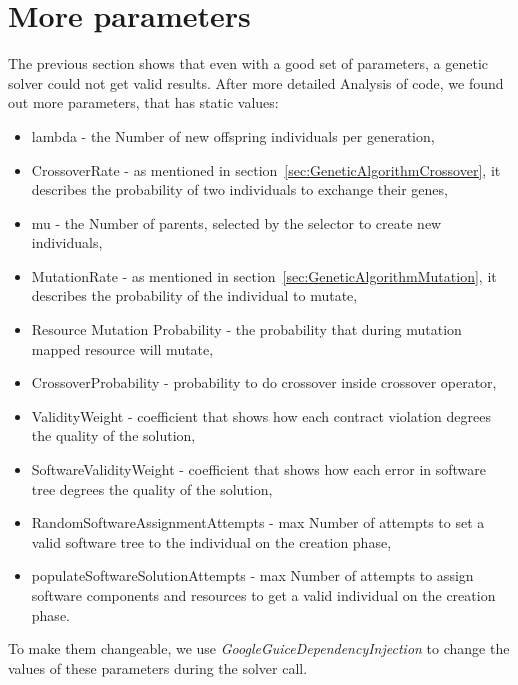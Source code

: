 \section{More parameters}
The previous section shows that even with a good set of parameters, a genetic solver could not get valid results.
After more detailed Analysis of code, we found out more parameters, that has static values:
\begin{itemize}
	\item lambda - the Number of new offspring individuals per generation,
	\item CrossoverRate - as mentioned in section~\ref{sec:GeneticAlgorithmCrossover}, it describes the probability of two individuals to exchange their genes,
	\item mu - the Number of parents, selected by the selector to create new individuals,
	\item MutationRate - as mentioned in section~\ref{sec:GeneticAlgorithmMutation}, it describes the probability of the individual to mutate,
	\item Resource Mutation Probability - the probability that during mutation mapped resource will mutate,
	\item CrossoverProbability - probability to do crossover inside crossover operator,
	\item ValidityWeight - coefficient that shows how each contract violation degrees the quality of the solution, 
	\item SoftwareValidityWeight - coefficient that shows how each error in software tree degrees the quality of the solution,
	\item RandomSoftwareAssignmentAttempts - max Number of attempts to set a valid software tree to the individual on the creation phase,
	\item populateSoftwareSolutionAttempts -  max Number of attempts to assign software components and resources to get a valid individual on the creation phase.
\end{itemize}

To make them changeable, we use \textit{GoogleGuiceDependencyInjection} to change the values of these parameters during the solver call.

